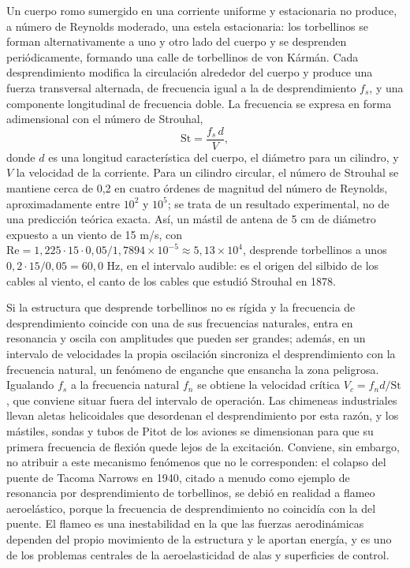 \documentclass[10pt,openany]{book}
\begin{document}
Un cuerpo romo sumergido en una corriente uniforme y estacionaria no produce, a número de Reynolds moderado, una estela estacionaria: los torbellinos se forman alternativamente a uno y otro lado del cuerpo y se desprenden periódicamente, formando una calle de torbellinos de von Kármán. Cada desprendimiento modifica la circulación alrededor del cuerpo y produce una fuerza transversal alternada, de frecuencia igual a la de desprendimiento \(f_s\), y una componente longitudinal de frecuencia doble. La frecuencia se expresa en forma adimensional con el número de Strouhal,
\begin{equation}
\mathrm{St} = \frac{f_s\,d}{V}, \label{eq:c08-strouhal}
\end{equation}
donde \(d\) es una longitud característica del cuerpo, el diámetro para un cilindro, y \(V\) la velocidad de la corriente. Para un cilindro circular, el número de Strouhal se mantiene cerca de 0,2 en cuatro órdenes de magnitud del número de Reynolds, aproximadamente entre \(10^{2}\) y \(10^{5}\); se trata de un resultado experimental, no de una predicción teórica exacta. Así, un mástil de antena de 5 cm de diámetro expuesto a un viento de 15 m/s, con \(\mathrm{Re} = 1{,}225\cdot 15\cdot 0{,}05/1{,}7894\times 10^{-5} \approx 5{,}13\times 10^{4}\), desprende torbellinos a unos \(0{,}2\cdot 15/0{,}05 = 60{,}0\) Hz, en el intervalo audible: es el origen del silbido de los cables al viento, el canto de los cables que estudió Strouhal en 1878.

Si la estructura que desprende torbellinos no es rígida y la frecuencia de desprendimiento coincide con una de sus frecuencias naturales, entra en resonancia y oscila con amplitudes que pueden ser grandes; además, en un intervalo de velocidades la propia oscilación sincroniza el desprendimiento con la frecuencia natural, un fenómeno de enganche que ensancha la zona peligrosa. Igualando \(f_s\) a la frecuencia natural \(f_n\) se obtiene la velocidad crítica \(V_c = f_n d/\mathrm{St}\), que conviene situar fuera del intervalo de operación. Las chimeneas industriales llevan aletas helicoidales que desordenan el desprendimiento por esta razón, y los mástiles, sondas y tubos de Pitot de los aviones se dimensionan para que su primera frecuencia de flexión quede lejos de la excitación. Conviene, sin embargo, no atribuir a este mecanismo fenómenos que no le corresponden: el colapso del puente de Tacoma Narrows en 1940, citado a menudo como ejemplo de resonancia por desprendimiento de torbellinos, se debió en realidad a flameo aeroelástico, porque la frecuencia de desprendimiento no coincidía con la del puente. El flameo es una inestabilidad en la que las fuerzas aerodinámicas dependen del propio movimiento de la estructura y le aportan energía, y es uno de los problemas centrales de la aeroelasticidad de alas y superficies de control.
\end{document}
